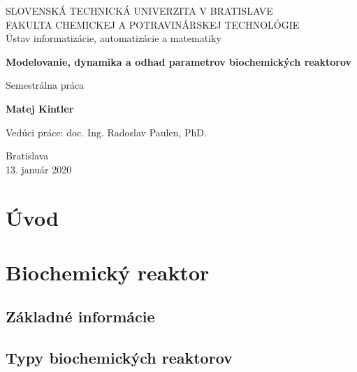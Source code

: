 \documentclass[fleqn]{article}
\begin{document}
	
\begin{titlepage}
	\begin{center}
		\vspace*{1cm}
		\LARGE
		SLOVENSKÁ TECHNICKÁ UNIVERZITA V BRATISLAVE \\
		\Large
		FAKULTA CHEMICKEJ A POTRAVINÁRSKEJ TECHNOLÓGIE \\
		\vspace*{.5cm}
		\large
		Ústav informatizácie, automatizácie a matematiky \\
		\vspace*{5cm}
		
		\Huge
		\textbf{Modelovanie, dynamika a odhad parametrov biochemických reaktorov}
		
		\vspace{0.5cm}
		\LARGE
		Semestrálna práca
		
		\vspace{1.5cm}
		
		\textbf{Matej Kintler}
		
		\vfill

		\large
		Vedúci práce: doc. Ing. Radoslav Paulen, PhD.
		
		\vspace{1.5cm}
	
		\Large
		Bratislava\\
		13. január 2020
		
	\end{center}
\end{titlepage}

\newpage

\tableofcontents
\pagestyle{empty}

\newpage
\pagestyle{plain}
\setcounter{page}{1}

\section{Úvod}

\newpage

\section{Biochemický reaktor}
\subsection{Základné informácie}


\subsection{Typy biochemických reaktorov}

\end{document}
